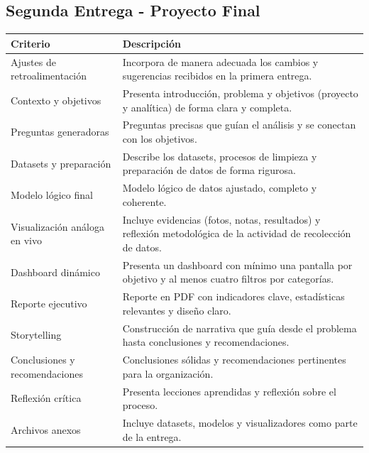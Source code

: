\documentclass[12pt, spanish]{article}
\begin{document}
\subsection*{Segunda Entrega - Proyecto Final}
\begin{table}[h!]
\centering
\begin{tabular}{|p{4.5cm}|p{10cm}|}
\hline
\textbf{Criterio} & \textbf{Descripción} \\
\hline
Ajustes de retroalimentación & Incorpora de manera adecuada los cambios y sugerencias recibidos en la primera entrega. \\
\hline
Contexto y objetivos & Presenta introducción, problema y objetivos (proyecto y analítica) de forma clara y completa. \\
\hline
Preguntas generadoras & Preguntas precisas que guían el análisis y se conectan con los objetivos. \\
\hline
Datasets y preparación & Describe los datasets, procesos de limpieza y preparación de datos de forma rigurosa. \\
\hline
Modelo lógico final & Modelo lógico de datos ajustado, completo y coherente. \\
\hline
Visualización análoga en vivo & Incluye evidencias (fotos, notas, resultados) y reflexión metodológica de la actividad de recolección de datos. \\
\hline
Dashboard dinámico & Presenta un dashboard con mínimo una pantalla por objetivo y al menos cuatro filtros por categorías. \\
\hline
Reporte ejecutivo & Reporte en PDF con indicadores clave, estadísticas relevantes y diseño claro. \\
\hline
Storytelling & Construcción de narrativa que guía desde el problema hasta conclusiones y recomendaciones. \\
\hline
Conclusiones y recomendaciones & Conclusiones sólidas y recomendaciones pertinentes para la organización. \\
\hline
Reflexión crítica & Presenta lecciones aprendidas y reflexión sobre el proceso. \\
\hline
Archivos anexos & Incluye datasets, modelos y visualizadores como parte de la entrega. \\
\hline
\end{tabular}
\end{table}
\end{document}
